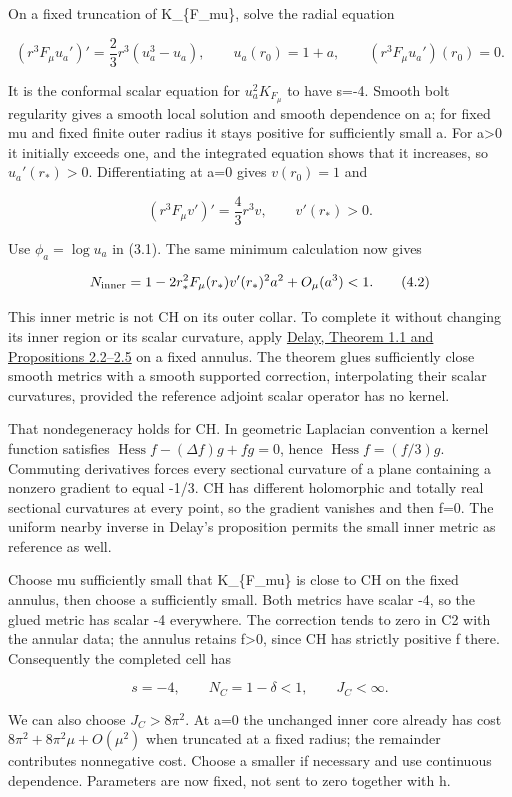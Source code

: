 \documentclass[
  10pt,
]{article}
\begin{document}
On a fixed truncation of K\_\{F\_mu\}, solve the radial equation

\[
 (r^3F_\mu u_a')'=\frac23r^3(u_a^3-u_a),\qquad
 u_a(r_0)=1+a,\qquad (r^3F_\mu u_a')(r_0)=0. \tag{4.1}
\]

It is the conformal scalar equation for \(u_a^2K_{F_\mu}\) to have s=-4.
Smooth bolt regularity gives a smooth local solution and smooth
dependence on a; for fixed mu and fixed finite outer radius it stays
positive for sufficiently small a. For a\textgreater0 it initially
exceeds one, and the integrated equation shows that it increases, so
\(u_a'(r_*)>0\). Differentiating at a=0 gives \(v(r_0)=1\) and

\[
 (r^3F_\mu v')'=\frac43r^3v,\qquad v'(r_*)>0.
\]

Use \(\phi_a=\log u_a\) in (3.1). The same minimum calculation now gives

\[
 N_{\rm inner}=1-2r_*^2F_\mu(r_*)v'(r_*)^2a^2+O_\mu(a^3)<1.
 \tag{4.2}
\]

This inner metric is not CH on its outer collar. To complete it without
changing its inner region or its scalar curvature, apply
\href{https://arxiv.org/html/1003.5146}{Delay, Theorem 1.1 and
Propositions 2.2--2.5} on a fixed annulus. The theorem glues
sufficiently close smooth metrics with a smooth supported correction,
interpolating their scalar curvatures, provided the reference adjoint
scalar operator has no kernel.

That nondegeneracy holds for CH. In geometric Laplacian convention a
kernel function satisfies \(\operatorname{Hess}f-(\Delta f)g+fg=0\),
hence \(\operatorname{Hess}f=(f/3)g\). Commuting derivatives forces
every sectional curvature of a plane containing a nonzero gradient to
equal -1/3. CH has different holomorphic and totally real sectional
curvatures at every point, so the gradient vanishes and then f=0. The
uniform nearby inverse in Delay's proposition permits the small inner
metric as reference as well.

Choose mu sufficiently small that K\_\{F\_mu\} is close to CH on the
fixed annulus, then choose a sufficiently small. Both metrics have
scalar -4, so the glued metric has scalar -4 everywhere. The correction
tends to zero in C2 with the annular data; the annulus retains
f\textgreater0, since CH has strictly positive f there. Consequently the
completed cell has

\[
 s=-4,\qquad N_C=1-\delta<1,\qquad J_C<\infty. \tag{4.3}
\]

We can also choose \(J_C>8\pi^2\). At a=0 the unchanged inner core
already has cost \(8\pi^2+8\pi^2\mu+O(\mu^2)\) when truncated at a fixed
radius; the remainder contributes nonnegative cost. Choose a smaller if
necessary and use continuous dependence. Parameters are now fixed, not
sent to zero together with h.
\end{document}
